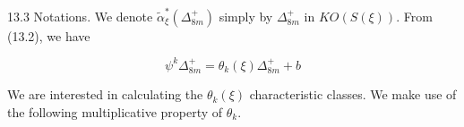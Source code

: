13.3 Notations. We denote $\tilde{\alpha}^*_{\xi}(\Delta^+_{8m})$ simply by $\Delta^+_{8m}$ in $KO(S(\xi))$. From (13.2), we have

$$\psi^k \Delta^+_{8m} = \theta_k(\xi) \Delta^+_{8m} + b$$

We are interested in calculating the $\theta_k(\xi)$ characteristic classes. We make use of the following multiplicative property of $\theta_k$.
